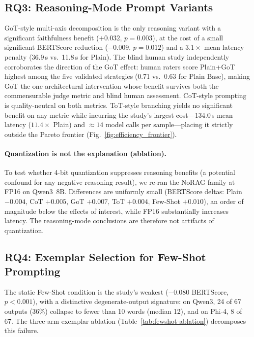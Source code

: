 \documentclass[pdflatex,sn-mathphys-ay]{sn-jnl}%
\theoremstyle{thmstyleone}%
\theoremstyle{thmstyletwo}%
\theoremstyle{thmstylethree}%
\begin{document}
{%
\subsection{RQ3: Reasoning-Mode Prompt Variants}
\label{sec:rq3}
GoT-style multi-axis decomposition is the only reasoning variant with a significant faithfulness benefit ($+0.032$, $p=0.003$), at the cost of a small significant BERTScore reduction ($-0.009$, $p=0.012$) and a $3.1\times$ mean latency penalty (36.9\,s vs.\ 11.8\,s for Plain). The blind human study independently corroborates the direction of the GoT effect: human raters score Plain+GoT highest among the five validated strategies (0.71 vs.\ 0.63 for Plain Base), making GoT the one architectural intervention whose benefit survives both the commensurable judge metric and blind human assessment. CoT-style prompting is quality-neutral on both metrics. ToT-style branching yields no significant benefit on any metric while incurring the study's largest cost---134.0\,s mean latency ($11.4\times$ Plain) and ${\approx}14$ model calls per sample---placing it strictly outside the Pareto frontier (Fig.~\ref{fig:efficiency_frontier}).

\paragraph{Quantization is not the explanation (ablation).}
To test whether 4-bit quantization suppresses reasoning benefits (a potential confound for any negative reasoning result), we re-ran the NoRAG family at FP16 on Qwen3~8B. Differences are uniformly small (BERTScore deltas: Plain $-0.004$, CoT $+0.005$, GoT $+0.007$, ToT $+0.004$, Few-Shot $+0.010$), an order of magnitude below the effects of interest, while FP16 substantially increases latency. The reasoning-mode conclusions are therefore not artifacts of quantization.

\subsection{RQ4: Exemplar Selection for Few-Shot Prompting}
\label{sec:rq4}
The static Few-Shot condition is the study's weakest ($-0.080$ BERTScore, $p<0.001$), with a distinctive degenerate-output signature: on Qwen3, 24 of 67 outputs (36\%) collapse to fewer than 10 words (median 12), and on Phi-4, 8 of 67. The three-arm exemplar ablation (Table~\ref{tab:fewshot-ablation}) decomposes this failure.

}
\end{document}

